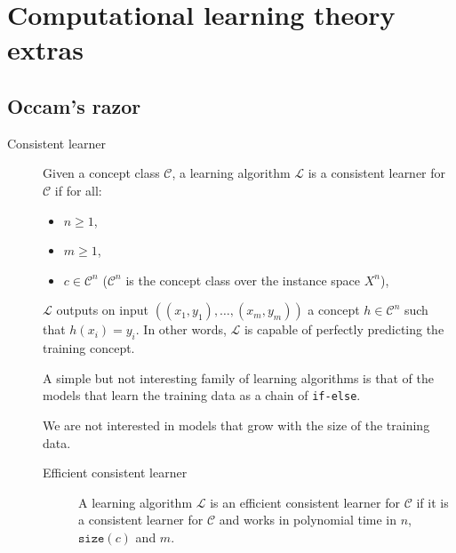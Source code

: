 \newpage
{}
\chapter{Computational learning theory extras}


\section{Occam's razor}

\begin{description}
    \item[Consistent learner] 
        Given a concept class $\mathcal{C}$, a learning algorithm $\mathcal{L}$ is a consistent learner for $\mathcal{C}$ if for all:
        \begin{itemize}
            \item $n \geq 1$,
            \item $m \geq 1$,
            \item $c \in \mathcal{C}^n$ ($\mathcal{C}^n$ is the concept class over the instance space $X^n$), 
        \end{itemize}
        $\mathcal{L}$ outputs on input $((x_1, y_1), \dots, (x_m, y_m))$ a concept $h \in \mathcal{C}^n$ such that $h(x_i) = y_i$.
        In other words, $\mathcal{L}$ is capable of perfectly predicting the training concept.


        \begin{remark}
            A simple but not interesting family of learning algorithms is that of the models 
            that learn the training data as a chain of \texttt{if-else}.

            We are not interested in models that grow with the size of the training data.
        \end{remark}

        \begin{description}
            \item[Efficient consistent learner] 
                A learning algorithm $\mathcal{L}$ is an efficient consistent learner for $\mathcal{C}$
                if it is a consistent learner for $\mathcal{C}$ and works in polynomial time in $n$, $\texttt{size}(c)$ and $m$.
        \end{description}
\end{description}

